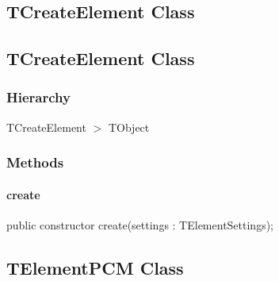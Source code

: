 \documentclass{report}
\newif\ifpdf
\begin{document}
\subsection*{\large{\textbf{TCreateElement Class}}\normalsize\hspace{1ex}\hrulefill}
\else
\subsection*{TCreateElement Class}
\fi
\label{morse.pcm.Util.TCreateElement}
\subsubsection*{\large{\textbf{Hierarchy}}\normalsize\hspace{1ex}\hfill}
TCreateElement {$>$} TObject
\subsubsection*{\large{\textbf{Methods}}\normalsize\hspace{1ex}\hfill}
\paragraph*{create}\hspace*{\fill}

\label{morse.pcm.Util.TCreateElement-create}
\begin{list}{}{
\setlength{\itemindent}{0cm}
\setlength{\listparindent}{0cm}
\setlength{\leftmargin}{\evensidemargin}
\addtolength{\leftmargin}{\tmplength}
\settowidth{\labelsep}{X}
\addtolength{\leftmargin}{\labelsep}
\setlength{\labelwidth}{\tmplength}
}
\item[\textbf{Declaration}\hfill]
\ifpdf
\begin{flushleft}
\fi
\begin{ttfamily}
public constructor create(settings : TElementSettings);\end{ttfamily}

\ifpdf
\end{flushleft}
\fi

\end{list}
\ifpdf
\subsection*{\large{\textbf{TElementPCM Class}}\normalsize\hspace{1ex}\hrulefill}
\else
\end{document}
